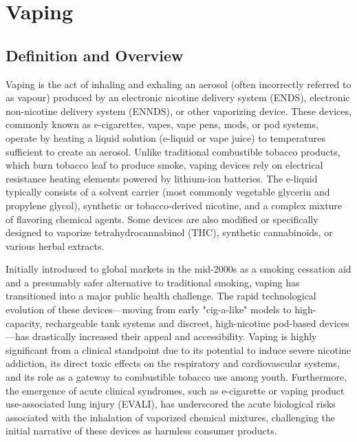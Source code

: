 \chapter{Vaping}

\section*{Definition and Overview}
Vaping is the act of inhaling and exhaling an aerosol (often incorrectly referred to as vapour) produced by an electronic nicotine delivery system (ENDS), electronic non-nicotine delivery system (ENNDS), or other vaporizing device. These devices, commonly known as e-cigarettes, vapes, vape pens, mods, or pod systems, operate by heating a liquid solution (e-liquid or vape juice) to temperatures sufficient to create an aerosol. Unlike traditional combustible tobacco products, which burn tobacco leaf to produce smoke, vaping devices rely on electrical resistance heating elements powered by lithium-ion batteries. The e-liquid typically consists of a solvent carrier (most commonly vegetable glycerin and propylene glycol), synthetic or tobacco-derived nicotine, and a complex mixture of flavoring chemical agents. Some devices are also modified or specifically designed to vaporize tetrahydrocannabinol (THC), synthetic cannabinoids, or various herbal extracts.

Initially introduced to global markets in the mid-2000s as a smoking cessation aid and a presumably safer alternative to traditional smoking, vaping has transitioned into a major public health challenge. The rapid technological evolution of these devices---moving from early "cig-a-like" models to high-capacity, rechargeable tank systems and discreet, high-nicotine pod-based devices---has drastically increased their appeal and accessibility. Vaping is highly significant from a clinical standpoint due to its potential to induce severe nicotine addiction, its direct toxic effects on the respiratory and cardiovascular systems, and its role as a gateway to combustible tobacco use among youth. Furthermore, the emergence of acute clinical syndromes, such as e-cigarette or vaping product use-associated lung injury (EVALI), has underscored the acute biological risks associated with the inhalation of vaporized chemical mixtures, challenging the initial narrative of these devices as harmless consumer products.

